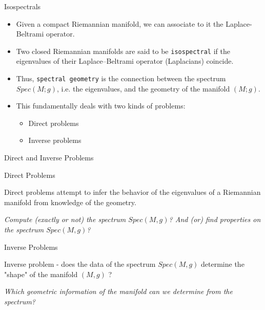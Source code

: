 \documentclass{beamer}
\begin{document}
\begin{frame}{Isospectrals}
\begin{itemize}
  \item Given a compact Riemannian manifold, we can associate to it the Laplace-Beltrami operator.
  
  \item Two closed Riemannian manifolds are said to be \texttt{isospectral} if the eigenvalues of their Laplace–Beltrami operator (Laplacians) coincide.

\item Thus, \texttt{spectral geometry} is the connection between the spectrum $ Spec(M; g)$, i.e. the eigenvalues, and the geometry of the manifold $ (M; g) $. 

\item This fundamentally deals with two kinds of problems:
    \begin{itemize}
        \item Direct problems
        \item Inverse problems
    \end{itemize}

\end{itemize}

\end{frame}

\begin{frame}{Direct and Inverse Problems}

\begin{block}{Direct Problems}

    Direct problems attempt to infer the behavior of the eigenvalues of a Riemannian manifold from knowledge of the geometry.

\textit{Compute (exactly or not) the spectrum $ Spec(M, g) $? And (or) find properties on the spectrum $ Spec(M,g) $?}

\end{block}

\begin{block}{Inverse Problems}
     
     Inverse problem - does the data of the spectrum $ Spec(M, g) $ determine the "shape" of the manifold $ (M, g) $ ?

\textit{Which geometric information of the manifold can we determine from the spectrum?}
\end{block}

\end{frame}
\end{document}
